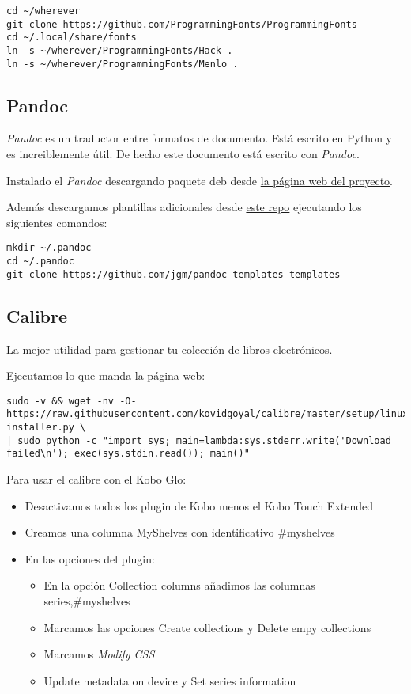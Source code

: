 \documentclass[
  12pt,
  spanish,
]{article}
\providecommand{\tightlist}{%
  \setlength{\itemsep}{0pt}\setlength{\parskip}{0pt}}
\begin{document}
\begin{verbatim}
cd ~/wherever
git clone https://github.com/ProgrammingFonts/ProgrammingFonts
cd ~/.local/share/fonts
ln -s ~/wherever/ProgrammingFonts/Hack .
ln -s ~/wherever/ProgrammingFonts/Menlo .
\end{verbatim}

\hypertarget{pandoc}{%
\subsection{Pandoc}\label{pandoc}}

\emph{Pandoc} es un traductor entre formatos de documento. Está escrito
en Python y es increiblemente útil. De hecho este documento está escrito
con \emph{Pandoc}.

Instalado el \emph{Pandoc} descargando paquete deb desde
\href{http://pandoc.org/installing.html}{la página web del proyecto}.

Además descargamos plantillas adicionales desde
\href{https://github.com/jgm/pandoc-templates}{este repo} ejecutando los
siguientes comandos:

\begin{verbatim}
mkdir ~/.pandoc
cd ~/.pandoc
git clone https://github.com/jgm/pandoc-templates templates
\end{verbatim}

\hypertarget{calibre}{%
\subsection{Calibre}\label{calibre}}

La mejor utilidad para gestionar tu colección de libros electrónicos.

Ejecutamos lo que manda la página web:

\begin{verbatim}
sudo -v && wget -nv -O- https://raw.githubusercontent.com/kovidgoyal/calibre/master/setup/linux-installer.py \
| sudo python -c "import sys; main=lambda:sys.stderr.write('Download failed\n'); exec(sys.stdin.read()); main()"
\end{verbatim}

Para usar el calibre con el Kobo Glo:

\begin{itemize}
\tightlist
\item
  Desactivamos todos los plugin de Kobo menos el Kobo Touch Extended
\item
  Creamos una columna MyShelves con identificativo \#myshelves
\item
  En las opciones del plugin:

  \begin{itemize}
  \tightlist
  \item
    En la opción Collection columns añadimos las columnas
    series,\#myshelves
  \item
    Marcamos las opciones Create collections y Delete empy collections
  \item
    Marcamos \emph{Modify CSS}
  \item
    Update metadata on device y Set series information
  \end{itemize}
\end{itemize}
\end{document}
